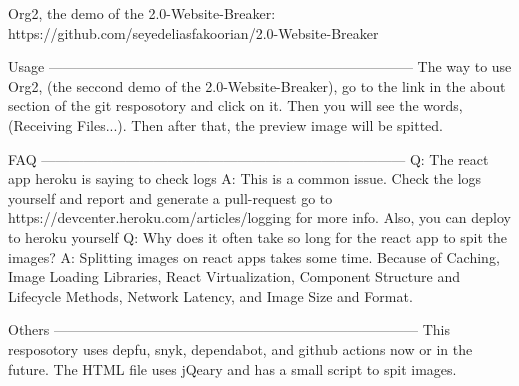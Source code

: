 Org2, the demo of the 2.0-Website-Breaker:
https://github.com/seyedeliasfakoorian/2.0-Website-Breaker

Usage
------------------------------------------------------------------------------
The way to use Org2, (the seccond demo of the 2.0-Website-Breaker), 
go to the link in the about section of the git resposotory and click on
it. Then you will see the words, (Receiving Files...). Then after that, 
the preview image will be spitted.

FAQ
------------------------------------------------------------------------------
Q: The react app heroku is saying to check logs
A: This is a common issue. Check the logs yourself and report and generate a
   pull-request go to https://devcenter.heroku.com/articles/logging for more
   info. Also, you can deploy to heroku yourself
Q: Why does it often take so long for the react app to spit the images?
A: Splitting images on react apps takes some time. Because of Caching,
   Image Loading Libraries, React Virtualization,
   Component Structure and Lifecycle Methods, Network Latency, and
   Image Size and Format.

Others
------------------------------------------------------------------------------
This resposotory uses depfu, snyk, dependabot, and github actions now
or in the future.
The HTML file uses jQeary and has a small script to spit images.
